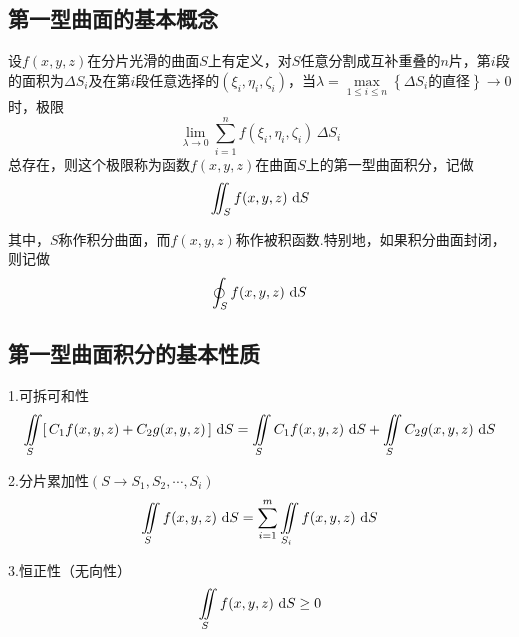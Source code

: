 \subsection{第一型曲面的基本概念}
\tdefination[第一型曲面积分的定义]
设$f(x,y,z)$在分片光滑的曲面$S$上有定义，对$S$任意分割成互补重叠的$n$片，第$i$段的面积为$\Delta S_i$及在第$i$段任意选择的$(\xi_i,\eta_i,\zeta_i)$，当$\lambda = \max\limits_{1 \le i \le n} \left\lbrace \Delta S_i\mbox{的直径}\right\rbrace \rightarrow 0$时，极限
\begin{equation}
	\lim_{\lambda \rightarrow 0} \sum^{n}_{i=1} f(\xi_i,\eta_i,\zeta_i)\,\Delta S_i
\end{equation}
总存在，则这个极限称为函数$f(x,y,z)$在曲面$S$上的第一型曲面积分，记做
\begin{equation}
	\iint_{S}f(x,y,z)\,\,{\rm{d}} S
\end{equation}
\par 其中，$S$称作积分曲面，而$f(x,y,z)$称作被积函数.特别地，如果积分曲面封闭，则记做
\begin{equation}
	\oint_{S}f(x,y,z)\,\,{\rm{d}} S
\end{equation}

\subsection{第一型曲面积分的基本性质}
\ttheorem[第一型曲面积分的三个基本性质]
1.可拆可和性
\begin{equation}
	\iint\limits_{S}[\,C_1f(x,y,z)+C_2g(x,y,z)\,]\,\,{\rm{d}} S =\iint\limits_{S}C_1f(x,y,z)\,\,{\rm{d}} S + \iint\limits_{S}C_2g(x,y,z)\,\,{\rm{d}} S
\end{equation}

\par 2.分片累加性$(S\rightarrow S_1,S_2,\cdots,S_i)$
\begin{equation}
	\iint\limits_{S}f(x,y,z)\,\,{\rm{d}} S = \sum_{i=1}^{m}\iint\limits_{S_i}f(x,y,z)\,\,{\rm{d}} S
\end{equation}

\par 3.恒正性（无向性）
\begin{equation}
	\iint\limits_{S}f(x,y,z)\,\,{\rm{d}} S \geq 0
\end{equation}


